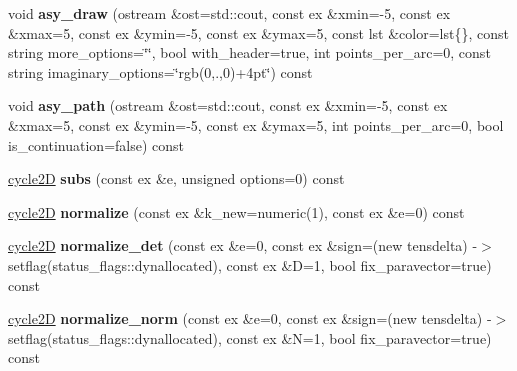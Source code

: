 \begin{DoxyCompactItemize}
\item 
\mbox{\label{class_moeb_inv_1_1cycle2_d_a46c94eb343ee725668fc5eb53a04bd3d}} 
void {\bfseries asy\+\_\+draw} (ostream \&ost=std\+::cout, const ex \&xmin=-\/5, const ex \&xmax=5, const ex \&ymin=-\/5, const ex \&ymax=5, const lst \&color=lst\{\}, const string more\+\_\+options=\char`\"{}\char`\"{}, bool with\+\_\+header=true, int points\+\_\+per\+\_\+arc=0, const string imaginary\+\_\+options=\char`\"{}rgb(0,.,0)+4pt\char`\"{}) const
\item 
\mbox{\label{class_moeb_inv_1_1cycle2_d_a278dda55874cd3cf848f302ef6dafe0e}} 
void {\bfseries asy\+\_\+path} (ostream \&ost=std\+::cout, const ex \&xmin=-\/5, const ex \&xmax=5, const ex \&ymin=-\/5, const ex \&ymax=5, int points\+\_\+per\+\_\+arc=0, bool is\+\_\+continuation=false) const
\item 
\mbox{\label{class_moeb_inv_1_1cycle2_d_ad0170765bc192ecab6c4b0036952afb1}} 
\mbox{\hyperlink{class_moeb_inv_1_1cycle2_d}{cycle2D}} {\bfseries subs} (const ex \&e, unsigned options=0) const
\item 
\mbox{\label{class_moeb_inv_1_1cycle2_d_a593692e6c3e39757b5df6d00984b53ba}} 
\mbox{\hyperlink{class_moeb_inv_1_1cycle2_d}{cycle2D}} {\bfseries normalize} (const ex \&k\+\_\+new=numeric(1), const ex \&e=0) const
\item 
\mbox{\label{class_moeb_inv_1_1cycle2_d_a73a45bda26754cd4dd62146d2a64cd3d}} 
\mbox{\hyperlink{class_moeb_inv_1_1cycle2_d}{cycle2D}} {\bfseries normalize\+\_\+det} (const ex \&e=0, const ex \&sign=(new tensdelta) -\/$>$setflag(status\+\_\+flags\+::dynallocated), const ex \&D=1, bool fix\+\_\+paravector=true) const
\item 
\mbox{\label{class_moeb_inv_1_1cycle2_d_a72dfb32e4fa2ef6a02a650575a5ae65b}} 
\mbox{\hyperlink{class_moeb_inv_1_1cycle2_d}{cycle2D}} {\bfseries normalize\+\_\+norm} (const ex \&e=0, const ex \&sign=(new tensdelta) -\/$>$setflag(status\+\_\+flags\+::dynallocated), const ex \&N=1, bool fix\+\_\+paravector=true) const
\item 
\mbox{\label{class_moeb_inv_1_1cycle2_d_a32780a0a370c0b6151648cb2efb3a24b}} 

\end{DoxyCompactItemize}
